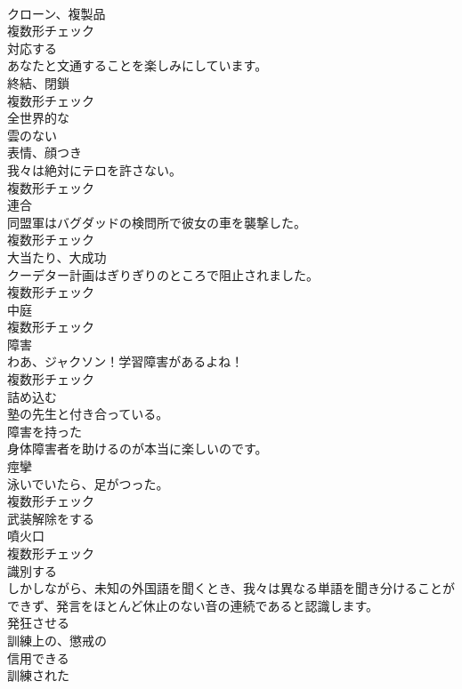 \documentclass[8pt]{extreport}
\begin{document}
\begin{CJK}{UTF8}{min}
\\	[名詞]	クローン、複製品	
\\	複数形チェック
\\	[形容詞]	対応する	
\\	あなたと文通することを楽しみにしています。	
\\	[名詞]	終結、閉鎖	
\\	複数形チェック
\\	[形容詞]	全世界的な	
\\	[形容詞]	雲のない	
\\	[名詞]	表情、顔つき	
\\	我々は絶対にテロを許さない。	
\\	複数形チェック
\\	[名詞]	連合	
\\	同盟軍はバグダッドの検問所で彼女の車を襲撃した。	
\\	複数形チェック
\\	[名詞]	大当たり、大成功	
\\	クーデター計画はぎりぎりのところで阻止されました。	
\\	複数形チェック
\\	[名詞]	中庭	
\\	複数形チェック
\\	[名詞]	障害	
\\	わあ、ジャクソン！学習障害があるよね！	
\\	複数形チェック
\\	[動詞]	詰め込む	
\\	塾の先生と付き合っている。	
\\	[形容詞]	障害を持った	
\\	身体障害者を助けるのが本当に楽しいのです。	
\\	[名詞]	痙攣	
\\	泳いでいたら、足がつった。	
\\	複数形チェック
\\	[動詞]	武装解除をする	
\\	[名詞]	噴火口	
\\	複数形チェック
\\	[動詞]	識別する	
\\	しかしながら、未知の外国語を聞くとき、我々は異なる単語を聞き分けることができず、発言をほとんど休止のない音の連続であると認識します。	
\\	[動詞]	発狂させる	
\\	[形容詞]	訓練上の、懲戒の	
\\	[形容詞]	信用できる	
\\	[形容詞]	訓練された	

\end{CJK}
\end{document}
